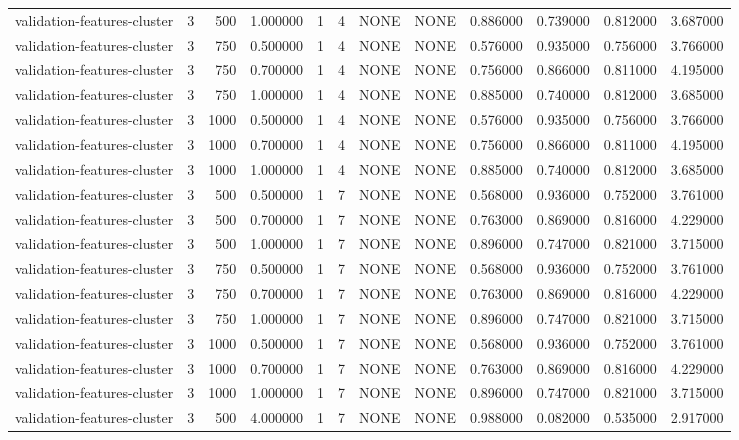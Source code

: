 \begin{tabular}{lrrrllllrrrr}
validation-features-cluster & 3 & 500 & 1.000000 & 1 & 4 & NONE & NONE & 0.886000 & 0.739000 & 0.812000 & 3.687000 \\
validation-features-cluster & 3 & 750 & 0.500000 & 1 & 4 & NONE & NONE & 0.576000 & 0.935000 & 0.756000 & 3.766000 \\
validation-features-cluster & 3 & 750 & 0.700000 & 1 & 4 & NONE & NONE & 0.756000 & 0.866000 & 0.811000 & 4.195000 \\
validation-features-cluster & 3 & 750 & 1.000000 & 1 & 4 & NONE & NONE & 0.885000 & 0.740000 & 0.812000 & 3.685000 \\
validation-features-cluster & 3 & 1000 & 0.500000 & 1 & 4 & NONE & NONE & 0.576000 & 0.935000 & 0.756000 & 3.766000 \\
validation-features-cluster & 3 & 1000 & 0.700000 & 1 & 4 & NONE & NONE & 0.756000 & 0.866000 & 0.811000 & 4.195000 \\
validation-features-cluster & 3 & 1000 & 1.000000 & 1 & 4 & NONE & NONE & 0.885000 & 0.740000 & 0.812000 & 3.685000 \\
validation-features-cluster & 3 & 500 & 0.500000 & 1 & 7 & NONE & NONE & 0.568000 & 0.936000 & 0.752000 & 3.761000 \\
validation-features-cluster & 3 & 500 & 0.700000 & 1 & 7 & NONE & NONE & 0.763000 & 0.869000 & 0.816000 & 4.229000 \\
validation-features-cluster & 3 & 500 & 1.000000 & 1 & 7 & NONE & NONE & 0.896000 & 0.747000 & 0.821000 & 3.715000 \\
validation-features-cluster & 3 & 750 & 0.500000 & 1 & 7 & NONE & NONE & 0.568000 & 0.936000 & 0.752000 & 3.761000 \\
validation-features-cluster & 3 & 750 & 0.700000 & 1 & 7 & NONE & NONE & 0.763000 & 0.869000 & 0.816000 & 4.229000 \\
validation-features-cluster & 3 & 750 & 1.000000 & 1 & 7 & NONE & NONE & 0.896000 & 0.747000 & 0.821000 & 3.715000 \\
validation-features-cluster & 3 & 1000 & 0.500000 & 1 & 7 & NONE & NONE & 0.568000 & 0.936000 & 0.752000 & 3.761000 \\
validation-features-cluster & 3 & 1000 & 0.700000 & 1 & 7 & NONE & NONE & 0.763000 & 0.869000 & 0.816000 & 4.229000 \\
validation-features-cluster & 3 & 1000 & 1.000000 & 1 & 7 & NONE & NONE & 0.896000 & 0.747000 & 0.821000 & 3.715000 \\
validation-features-cluster & 3 & 500 & 4.000000 & 1 & 7 & NONE & NONE & 0.988000 & 0.082000 & 0.535000 & 2.917000 \\

\end{tabular}

